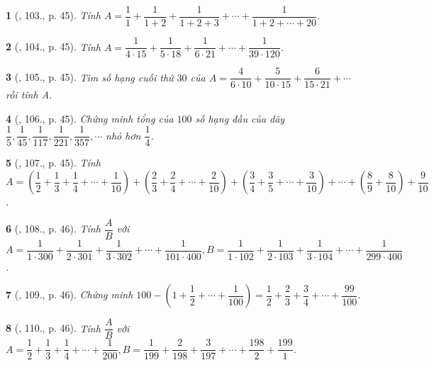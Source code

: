\documentclass{article}
\newtheorem{baitoan}{}
\begin{document}
\begin{baitoan}[\cite{Binh_Toan_6_tap_2}, 103., p. 45]
	Tính $A = \dfrac{1}{1} + \dfrac{1}{1 + 2} + \dfrac{1}{1 + 2 + 3} + \cdots + \dfrac{1}{1 + 2 + \cdots + 20}$.
\end{baitoan}

\begin{baitoan}[\cite{Binh_Toan_6_tap_2}, 104., p. 45]
	Tính $A = \dfrac{1}{4\cdot15} + \dfrac{1}{5\cdot18} + \dfrac{1}{6\cdot21} + \cdots + \dfrac{1}{39\cdot120}$.
\end{baitoan}

\begin{baitoan}[\cite{Binh_Toan_6_tap_2}, 105., p. 45]
	Tìm số hạng cuối thứ $30$ của $A = \dfrac{4}{6\cdot10} + \dfrac{5}{10\cdot15} + \dfrac{6}{15\cdot21} + \cdots$ rồi tính A.
\end{baitoan}

\begin{baitoan}[\cite{Binh_Toan_6_tap_2}, 106., p. 45]
	Chứng minh tổng của $100$ số hạng đầu của dãy $\dfrac{1}{5},\dfrac{1}{45},\dfrac{1}{117},\dfrac{1}{221},\dfrac{1}{357},\cdots$ nhỏ hơn $\dfrac{1}{4}$.
\end{baitoan}

\begin{baitoan}[\cite{Binh_Toan_6_tap_2}, 107., p. 45]
	Tính $A = \left(\dfrac{1}{2} + \dfrac{1}{3} + \dfrac{1}{4} + \cdots + \dfrac{1}{10}\right) + \left(\dfrac{2}{3} + \dfrac{2}{4} + \cdots + \dfrac{2}{10}\right) + \left(\dfrac{3}{4} + \dfrac{3}{5} + \cdots + \dfrac{3}{10}\right) + \cdots + \left(\dfrac{8}{9} + \dfrac{8}{10}\right) + \dfrac{9}{10}$.
\end{baitoan}

\begin{baitoan}[\cite{Binh_Toan_6_tap_2}, 108., p. 46]
	Tính $\dfrac{A}{B}$ với $A = \dfrac{1}{1\cdot300} + \dfrac{1}{2\cdot301} + \dfrac{1}{3\cdot302} + \cdots + \dfrac{1}{101\cdot400},B = \dfrac{1}{1\cdot102} + \dfrac{1}{2\cdot103} + \dfrac{1}{3\cdot104} + \cdots + \dfrac{1}{299\cdot400}$.
\end{baitoan}

\begin{baitoan}[\cite{Binh_Toan_6_tap_2}, 109., p. 46]
	Chứng minh $100 - \left(1 + \dfrac{1}{2} + \cdots + \dfrac{1}{100}\right) = \dfrac{1}{2} + \dfrac{2}{3} + \dfrac{3}{4} + \cdots + \dfrac{99}{100}$.
\end{baitoan}

\begin{baitoan}[\cite{Binh_Toan_6_tap_2}, 110., p. 46]
	Tính $\dfrac{A}{B}$ với $A = \dfrac{1}{2} + \dfrac{1}{3} + \dfrac{1}{4} + \cdots + \dfrac{1}{200},B = \dfrac{1}{199} + \dfrac{2}{198} + \dfrac{3}{197} + \cdots + \dfrac{198}{2} + \dfrac{199}{1}$.
\end{baitoan}
\end{document}
